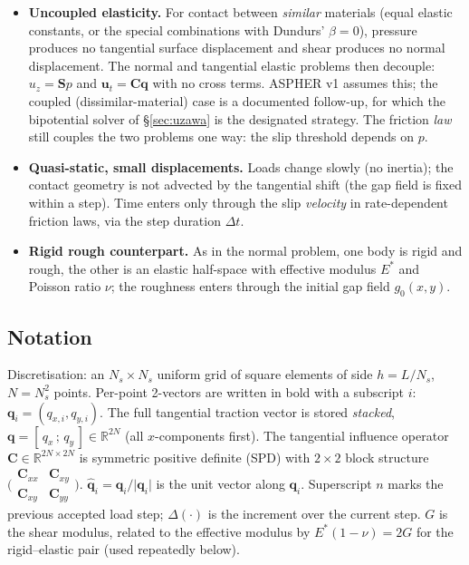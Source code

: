 \documentclass[11pt,a4paper]{article}
\newcommand{\R}{\mathbb{R}}
\newcommand{\bq}{\mathbf{q}}
\newcommand{\bu}{\mathbf{u}}
\newcommand{\bC}{\mathbf{C}}
\newcommand{\bS}{\mathbf{S}}
\newcommand{\qhat}{\hat{\bq}}
\newcommand{\abs}[1]{\lvert#1\rvert}
\newcommand{\Estar}{E^{*}}
\begin{document}
\begin{itemize}
\item \textbf{Uncoupled elasticity.} For contact between \emph{similar}
  materials (equal elastic constants, or the special combinations with
  Dundurs' $\beta = 0$), pressure produces no tangential surface
  displacement and shear produces no normal displacement. The normal and
  tangential elastic problems then decouple: $u_z = \bS p$ and
  $\bu_t = \bC \bq$ with no cross terms. ASPHER v1 assumes this; the
  coupled (dissimilar-material) case is a documented follow-up, for which
  the bipotential solver of \S\ref{sec:uzawa} is the designated strategy.
  The friction \emph{law} still couples the two problems one way: the
  slip threshold depends on $p$.
\item \textbf{Quasi-static, small displacements.} Loads change slowly
  (no inertia); the contact geometry is not advected by the tangential
  shift (the gap field is fixed within a step). Time enters only through
  the slip \emph{velocity} in rate-dependent friction laws, via the step
  duration $\Delta t$.
\item \textbf{Rigid rough counterpart.} As in the normal problem, one body
  is rigid and rough, the other is an elastic half-space with effective
  modulus $\Estar$ and Poisson ratio $\nu$; the roughness enters through
  the initial gap field $g_0(x,y)$.
\end{itemize}

\subsection{Notation}

Discretisation: an $N_s \times N_s$ uniform grid of square elements of side
$h = L/N_s$, $N = N_s^2$ points. Per-point 2-vectors are written in bold
with a subscript $i$: $\bq_i = (q_{x,i}, q_{y,i})$. The full tangential
traction vector is stored \emph{stacked},
$\bq = [\,q_x\,;\,q_y\,] \in \R^{2N}$ (all $x$-components first). The
tangential influence operator $\bC \in \R^{2N \times 2N}$ is symmetric
positive definite (SPD) with $2 \times 2$ block structure
$\bigl(\begin{smallmatrix} \bC_{xx} & \bC_{xy} \\ \bC_{xy} & \bC_{yy}
\end{smallmatrix}\bigr)$. $\qhat_i = \bq_i / \abs{\bq_i}$ is the unit vector
along $\bq_i$. Superscript $n$ marks the previous accepted load step;
$\Delta(\cdot)$ is the increment over the current step. $G$ is the shear
modulus, related to the effective modulus by $\Estar (1-\nu) = 2G$ for the
rigid--elastic pair (used repeatedly below).
\end{document}

